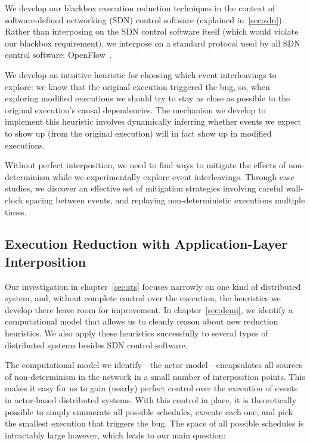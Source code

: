 We develop our blackbox execution reduction techniques
in the context of software-defined
networking (SDN) control software (explained in~\ref{sec:sdn}). Rather than interposing on the SDN control
software itself
(which would violate our blackbox requirement), we interpose on a standard
protocol used by all SDN control software: OpenFlow~\cite{openflow}.

We develop an intuitive heuristic for
choosing which event interleavings to explore: we know that the original execution triggered the bug, so, when exploring modified executions we should try to stay as close as possible to the original execution's causal dependencies.
The mechanism we develop to implement this heuristic involves dynamically inferring whether events we expect to show up (from the original execution) will in fact show up in modified executions.

Without perfect interposition, we need to find ways to mitigate the effects of
non-determinism while we experimentally explore event interleavings.
Through case studies, we discover an effective set of mitigation strategies involving careful wall-clock spacing between events, and replaying non-deterministic executions multiple times.

\subsection{Execution Reduction with Application-Layer Interposition}

Our investigation in chapter~\ref{sec:sts} focuses narrowly on one kind of
distributed system, and, without complete control over the execution, the heuristics we
develop there leave room for improvement. In chapter~\ref{sec:demi},
we identify a computational model that allows us to cleanly reason
about new reduction heuristics. We also apply these heuristics successfully
to several types of distributed systems besides SDN control software.

The computational model we identify---the actor model---encapsulates all sources of
non-determinism in the network in a small number of interposition points.
This makes it easy for us to gain (nearly) perfect control over the execution of events in actor-based distributed systems.
With this control in place, it is theoretically possible to simply enumerate all possible schedules, execute each one, and pick the smallest execution that triggers the bug.
The space of all possible schedules is intractably large however, which leads to our main question:

